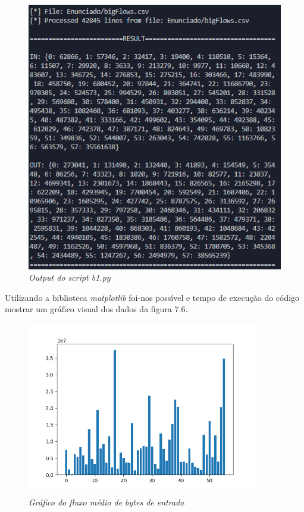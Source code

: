 \begin{figure}[h!]
    \label{high}
    \centering
    \includegraphics[width=1\textwidth]{Images/b1/b1_b.png}
    \caption{\textit{Output do script b1.py}}
\end{figure}

Utilizando a biblioteca \textit{matplotlib} \cite{MAT} foi-nos possível e tempo de execução do código mostrar um gráfico visual dos dados da figura 7.6.

\begin{figure}[h!]
    \label{high}
    \centering
    \includegraphics[width=0.9\textwidth]{Images/b1/b1_1.png}
    \caption{\textit{Gráfico do fluxo médio de bytes de entrada}}
\end{figure}

